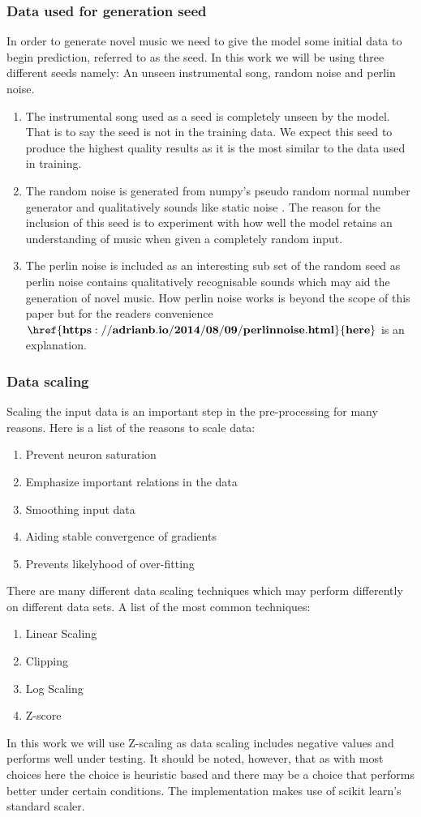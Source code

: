\documentclass{article}
\begin{document}
\subsubsection{Data used for generation seed}
In order to generate novel music we need to give the model some initial data to begin prediction, referred to as the seed. In this work we will be using three different seeds namely: An unseen instrumental song, random noise and perlin noise.
\begin{enumerate}
\item The instrumental song used as a seed is completely unseen by the model. That is to say the seed is not in the training data. We expect this seed to produce the highest quality results as it is the most similar to the data used in training.
\item The random noise is generated from numpy's pseudo random normal number generator and qualitatively sounds like static noise \cite{harris2020array}. The reason for the inclusion of this seed is to experiment with how well the model retains an understanding of music when given a completely random input.
\item The perlin noise is included as an interesting sub set of the random seed as perlin noise contains qualitatively recognisable sounds which may aid the generation of novel music. How perlin noise works is beyond the scope of this paper but for the readers convenience $\mathbf{\href{https://adrianb.io/2014/08/09/perlinnoise.html}{here}}$ is an explanation.
\end{enumerate}

\pagebreak

\subsubsection{Data scaling}
Scaling the input data is an important step in the pre-processing for many reasons. Here is a list of the reasons to scale data:
\begin{enumerate}
\item Prevent neuron saturation
\item Emphasize important relations in the data
\item Smoothing input data 
\item Aiding stable convergence of gradients
\item Prevents likelyhood of over-fitting
\end{enumerate}
There are many different data scaling techniques which may perform differently on different data sets. A list of the most common techniques:
\begin{enumerate}
\item Linear Scaling
\item Clipping 
\item Log Scaling
\item Z-score
\end{enumerate}
In this work we will use Z-scaling as data scaling includes negative values and performs well under testing. It should be noted, however, that as with most choices here the choice is heuristic based and there may be a choice that performs better under certain conditions. The implementation makes use of scikit learn's standard scaler\cite{scikit-learn}.
\end{document}
